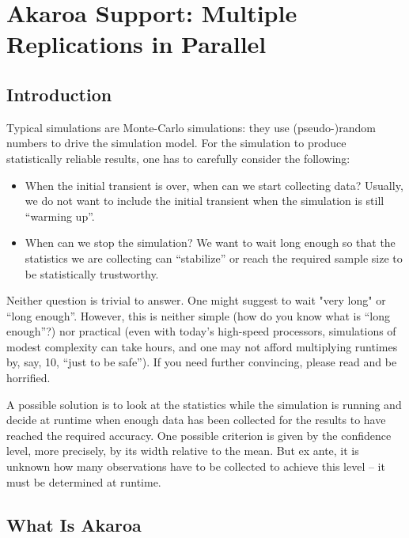 \section{Akaroa Support: Multiple Replications in Parallel}
\label{sec:run-sim:akaroa}

\subsection{Introduction}
\label{sec:run-sim:akaroa-introduction}

Typical simulations are Monte-Carlo simulations: they use
(pseudo-)random numbers to drive the simulation model.
For the simulation to produce statistically reliable results,
one has to carefully consider the following:

\begin{itemize}
  \item When the initial transient is over, when can we start
    collecting data? Usually, we do not want to include the
    initial transient when the simulation is still ``warming up''.
  \item When can we stop the simulation? We want to wait long enough
    so that the statistics we are collecting can ``stabilize''
    or reach the required sample size to be statistically trustworthy.
\end{itemize}

Neither question is trivial to answer. One might suggest
to wait "very long" or ``long enough''. However, this is neither
simple (how do you know what is ``long enough''?) nor practical
(even with today's high-speed processors, simulations of modest complexity
can take hours, and one may not afford multiplying runtimes by,
say, 10, ``just to be safe''). If you need further convincing,
please read \cite{Pawlikowsky02} and be horrified.

A possible solution is to look at the statistics while the simulation
is running and decide at runtime when enough data has been
collected for the results to have reached the required accuracy.
One possible criterion is given by the confidence level,
more precisely, by its width relative to the mean.
But ex ante, it is unknown how many observations have to be collected
to achieve this level -- it must be determined at runtime.


\subsection{What Is Akaroa}
\label{sec:run-sim:what-is-akaroa}

